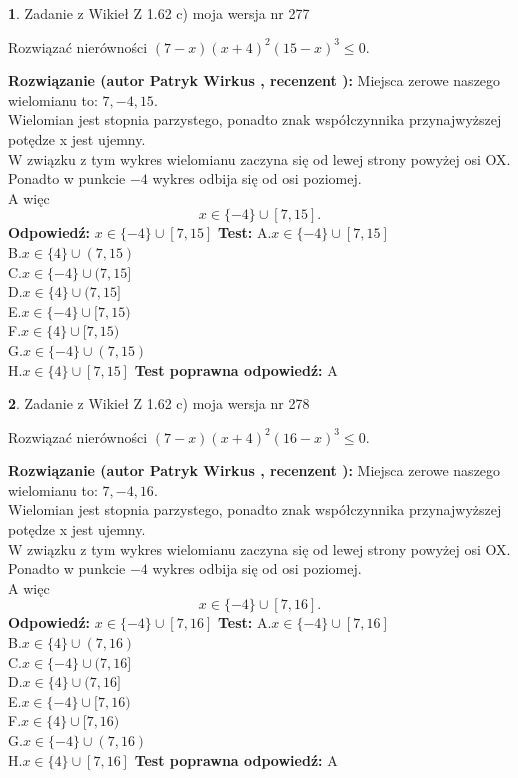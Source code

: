 \documentclass[12pt, a4paper]{article}
\theoremstyle{definition} %
\newtheorem{zad}{}
\newcommand{\zadStart}[1]{\begin{zad}#1\newline}
\newcommand{\zadStop}{\end{zad}}
\newcommand{\rozwStart}[2]{\noindent \textbf{Rozwiązanie (autor #1 , recenzent #2): }\newline}
\newcommand{\rozwStop}{\newline}
\newcommand{\odpStart}{\noindent \textbf{Odpowiedź:}\newline}
\newcommand{\odpStop}{\newline}
\newcommand{\testStart}{\noindent \textbf{Test:}\newline}
\newcommand{\testStop}{\newline}
\newcommand{\kluczStart}{\noindent \textbf{Test poprawna odpowiedź:}\newline}
\newcommand{\kluczStop}{\newline}
\begin{document}
\zadStart{Zadanie z Wikieł Z 1.62 c) moja wersja nr 277}

Rozwiązać nierówności $(7-x)(x+4)^{2}(15-x)^{3}\le0$.
\zadStop
\rozwStart{Patryk Wirkus}{}
Miejsca zerowe naszego wielomianu to: $7, -4, 15$.\\
Wielomian jest stopnia parzystego, ponadto znak współczynnika przy\linebreak najwyższej potędze x jest ujemny.\\ W związku z tym wykres wielomianu zaczyna się od lewej strony powyżej osi OX.\\
Ponadto w punkcie $-4$ wykres odbija się od osi poziomej.\\
A więc $$x \in \{-4\} \cup [7,15].$$
\rozwStop
\odpStart
$x \in \{-4\} \cup [7,15]$
\odpStop
\testStart
A.$x \in \{-4\} \cup [7,15]$\\
B.$x \in \{4\} \cup (7,15)$\\
C.$x \in \{-4\} \cup (7,15]$\\
D.$x \in \{4\} \cup (7,15]$\\
E.$x \in \{-4\} \cup [7,15)$\\
F.$x \in \{4\} \cup [7,15)$\\
G.$x \in \{-4\} \cup (7,15)$\\
H.$x \in \{4\} \cup [7,15]$
\testStop
\kluczStart
A
\kluczStop



\zadStart{Zadanie z Wikieł Z 1.62 c) moja wersja nr 278}

Rozwiązać nierówności $(7-x)(x+4)^{2}(16-x)^{3}\le0$.
\zadStop
\rozwStart{Patryk Wirkus}{}
Miejsca zerowe naszego wielomianu to: $7, -4, 16$.\\
Wielomian jest stopnia parzystego, ponadto znak współczynnika przy\linebreak najwyższej potędze x jest ujemny.\\ W związku z tym wykres wielomianu zaczyna się od lewej strony powyżej osi OX.\\
Ponadto w punkcie $-4$ wykres odbija się od osi poziomej.\\
A więc $$x \in \{-4\} \cup [7,16].$$
\rozwStop
\odpStart
$x \in \{-4\} \cup [7,16]$
\odpStop
\testStart
A.$x \in \{-4\} \cup [7,16]$\\
B.$x \in \{4\} \cup (7,16)$\\
C.$x \in \{-4\} \cup (7,16]$\\
D.$x \in \{4\} \cup (7,16]$\\
E.$x \in \{-4\} \cup [7,16)$\\
F.$x \in \{4\} \cup [7,16)$\\
G.$x \in \{-4\} \cup (7,16)$\\
H.$x \in \{4\} \cup [7,16]$
\testStop
\kluczStart
A
\kluczStop
\end{document}

